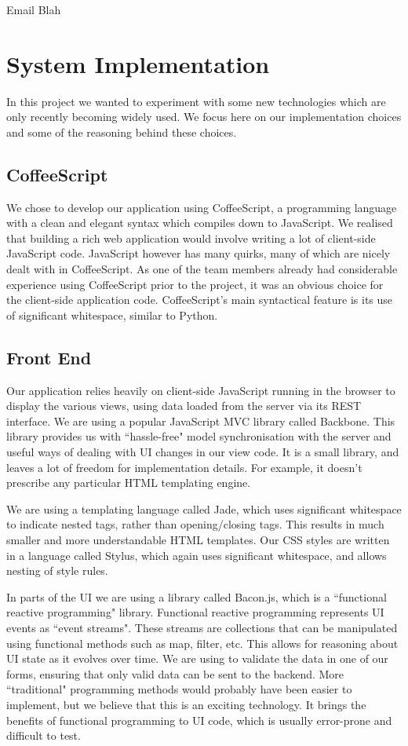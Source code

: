 \documentclass[11pt]{article}
\begin{document}
Email Blah

\section {System Implementation}

In this project we wanted to experiment with some new technologies which are only recently becoming widely used. We focus here on our implementation choices and some of the reasoning behind these choices.

\subsection{CoffeeScript}
We chose to develop our application using CoffeeScript, a programming language with a clean and elegant syntax which compiles down to JavaScript. We realised that building a rich web application would involve writing a lot of client-side JavaScript code. JavaScript however has many quirks, many of which are nicely dealt with in CoffeeScript. As one of the team members already had considerable experience using CoffeeScript prior to the project, it was an obvious choice for the client-side application code. CoffeeScript's main syntactical feature is its use of significant whitespace, similar to Python.

\subsection {Front End}

Our application relies heavily on client-side JavaScript running in the browser to display the various views, using data loaded from the server via its REST interface.
We are using a popular JavaScript MVC library called Backbone. This library provides us with ``hassle-free" model synchronisation with the server and useful ways of dealing with UI changes in our view code. It is a small library, and leaves a lot of freedom for implementation details. For example, it doesn't prescribe any particular HTML templating engine.

We are using a templating language called Jade, which uses significant whitespace to indicate nested tags, rather than opening/closing tags. This results in much smaller and more understandable HTML templates. Our CSS styles are written in a language called Stylus, which again uses significant whitespace, and allows nesting of style rules.

In parts of the UI we are using a library called Bacon.js, which is a ``functional reactive programming" library. Functional reactive programming represents UI events as ``event streams". These streams are collections that can be manipulated using functional methods such as map, filter, etc. This allows for reasoning about UI state as it evolves over time. We are using to validate the data in one of our forms, ensuring that only valid data can be sent to the backend. More ``traditional" programming methods would probably have been easier to implement, but we believe that this is an exciting technology. It brings the benefits of functional programming to UI code, which is usually error-prone and difficult to test.
\end{document}
